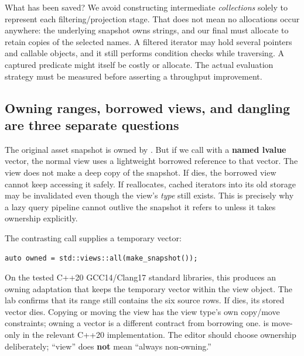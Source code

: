What has been saved? We avoid constructing intermediate \emph{collections} solely to represent each filtering/projection stage. That does not mean no allocations occur anywhere: the underlying snapshot owns strings, and our final  must allocate to retain copies of the selected names. A filtered iterator may hold several pointers and callable objects, and it still performs condition checks while traversing. A captured predicate might itself be costly or allocate. The actual evaluation strategy must be measured before asserting a throughput improvement.

\subsection{Owning ranges, borrowed views, and dangling are three separate questions}\label{01-foundations-i-ch006-owning-ranges-borrowed-views-and-dangling-are-three-separate-questions}

\hypertarget{01-foundations-i-ch006-owning-ranges-borrowed-views-and-dangling-are-three-separate-questions}{}

The original asset snapshot is owned by . But if we call  with a \textbf{named lvalue} vector, the normal view uses a lightweight borrowed reference to that vector. The view does not make a deep copy of the snapshot. If  dies, the borrowed view cannot keep accessing it safely. If  reallocates, cached iterators into its old storage may be invalidated even though the view's \emph{type} still exists. This is precisely why a lazy query pipeline cannot outlive the snapshot it refers to unless it takes ownership explicitly.

The contrasting call supplies a temporary vector:

\begin{verbatim}
auto owned = std::views::all(make_snapshot());
\end{verbatim}

On the tested C++20 GCC14/Clang17 standard libraries, this produces an owning adaptation that keeps the temporary vector within the view object. The lab confirms that its range still contains the six source rows. If  dies, its stored vector dies. Copying or moving the view has the view type's own copy/move constraints; owning a vector is a different contract from borrowing one.  is move-only in the relevant C++20 implementation. The editor should choose ownership deliberately; ``view'' does \textbf{not} mean ``always non-owning.''

